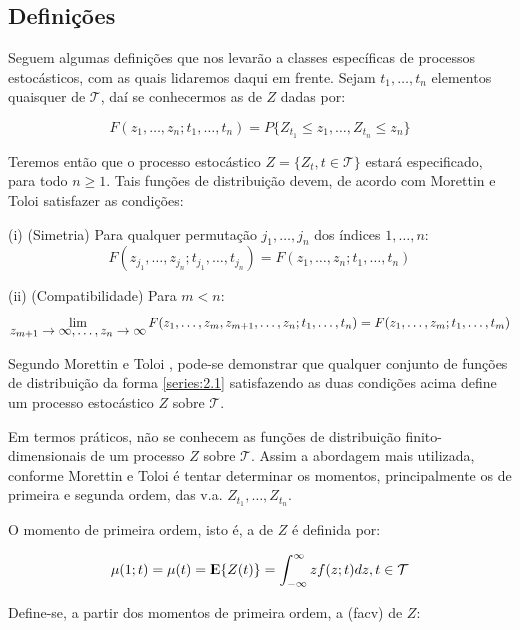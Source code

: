 \subsection{Definições}

Seguem algumas definições que nos levarão a classes específicas de processos estocásticos, com as quais lidaremos daqui em frente. Sejam $t_1, \ldots, t_n$ elementos quaisquer de $\mathcal{T}$, daí se conhecermos as  de $Z$ dadas por:

\begin{equation}\label{series:2.1}
F(z_1, \ldots, z_n; t_1, \ldots, t_n) = P\{ Z_{t_1} \leq z_1, \ldots, Z_{t_n} \leq z_n \}
\end{equation}

Teremos então que o processo estocástico $Z = \{ Z_t, t \in \mathcal{T} \}$ estará especificado, para todo $n \geq 1$. Tais funções de distribuição devem, de acordo com Morettin e Toloi \citep{morettin} satisfazer as condições:

	(i) (Simetria) Para qualquer permutação $j_1, \ldots, j_n$ dos índices $1, \dots, n$:
\[ F(z_{j_1}, \ldots, z_{j_n}; t_{j_1}, \ldots, t_{j_n}) = F(z_1, \ldots, z_n; t_1, \ldots, t_n) \]

	(ii) (Compatibilidade) Para $m < n$:
\[ \lim_{\mathlarger{z_{m+1} \to \infty, \ldots, z_n \to \infty}} F(z_1, \ldots, z_m, z_{m+1}, \ldots, z_n; t_1, \ldots, t_n) = F(z_1, \ldots, z_m; t_1, \ldots, t_m) \]

Segundo Morettin e Toloi \citep{morettin}, pode-se demonstrar que qualquer conjunto de funções de distribuição da forma \ref{series:2.1} satisfazendo as duas condições acima define um processo estocástico $Z$ sobre $\mathcal{T}$.

Em termos práticos, não se conhecem as funções de distribuição finito-dimensionais de um processo $Z$ sobre $\mathcal{T}$. Assim a abordagem mais utilizada, conforme Morettin e Toloi \citep{morettin} é tentar determinar os momentos, principalmente os de primeira e segunda ordem, das v.a. $Z_{t_1}, \ldots, Z_{t_n}$. 

O momento de primeira ordem, isto é, a  de $Z$ é definida por: 

\begin{equation}\label{series:2.5}
\mu(1; t) = \mu(t) = {\rm I\kern-.3em E}\{Z(t)\} = \int_{-\infty}^{\infty} z f(z;t)dz, t \in \mathcal{T}
\end{equation}

Define-se, a partir dos momentos de primeira ordem, a  (facv) de $Z$:

